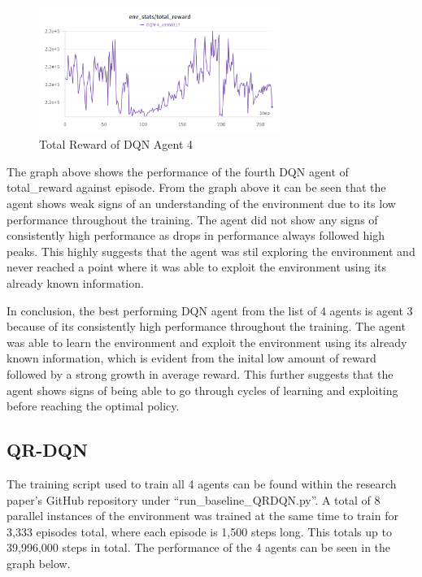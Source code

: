 \begin{figure}[H]
    \centering
    \includegraphics[width=0.7\textwidth]{figures/DQN-4_TotalReward.png}
    \caption{Total Reward of DQN Agent 4}
    \label{fig:agent_eval_dqn_4}
\end{figure}

The graph above shows the performance of the fourth DQN agent of total\_reward against episode. From the graph above it can be seen that the agent shows weak signs of an understanding of the environment due to its low performance throughout the training. The agent did not show any signs of consistently high performance as drops in performance always followed high peaks. This highly suggests that the agent was stil exploring the environment and never reached a point where it was able to exploit the environment using its already known information.

In conclusion, the best performing DQN agent from the list of 4 agents is agent 3 because of its consistently high performance throughout the training. The agent was able to learn the environment and exploit the environment using its already known information, which is evident from the inital low amount of reward followed by a strong growth in average reward. This further suggests that the agent shows signs of being able to go through cycles of learning and exploiting before reaching the optimal policy. 

\subsection{QR-DQN}

The training script used to train all 4 agents can be found within the research paper's GitHub repository under ``run\_baseline\_QRDQN.py''. A total of 8 parallel instances of the environment was trained at the same time to train for 3,333 episodes total, where each episode is 1,500 steps long. This totals up to 39,996,000 steps in total. The performance of the 4 agents can be seen in the graph below. 

